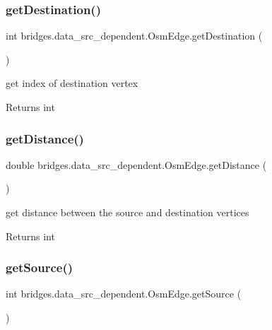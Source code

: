 \subsubsection{\texorpdfstring{get\+Destination()}{getDestination()}}
{\footnotesize\ttfamily int bridges.\+data\+\_\+src\+\_\+dependent.\+Osm\+Edge.\+get\+Destination (\begin{DoxyParamCaption}{ }\end{DoxyParamCaption})}

get index of destination vertex \begin{DoxyReturn}{Returns}
int 
\end{DoxyReturn}
\mbox{\label{classbridges_1_1data__src__dependent_1_1_osm_edge_a0bad934b9b643d5d0e375eb4210601a5}} 
\subsubsection{\texorpdfstring{get\+Distance()}{getDistance()}}
{\footnotesize\ttfamily double bridges.\+data\+\_\+src\+\_\+dependent.\+Osm\+Edge.\+get\+Distance (\begin{DoxyParamCaption}{ }\end{DoxyParamCaption})}

get distance between the source and destination vertices \begin{DoxyReturn}{Returns}
int 
\end{DoxyReturn}
\mbox{\label{classbridges_1_1data__src__dependent_1_1_osm_edge_a4ffc915a30144db8e3c1521772a6a26d}} 
\subsubsection{\texorpdfstring{get\+Source()}{getSource()}}
{\footnotesize\ttfamily int bridges.\+data\+\_\+src\+\_\+dependent.\+Osm\+Edge.\+get\+Source (\begin{DoxyParamCaption}{ }\end{DoxyParamCaption})}

